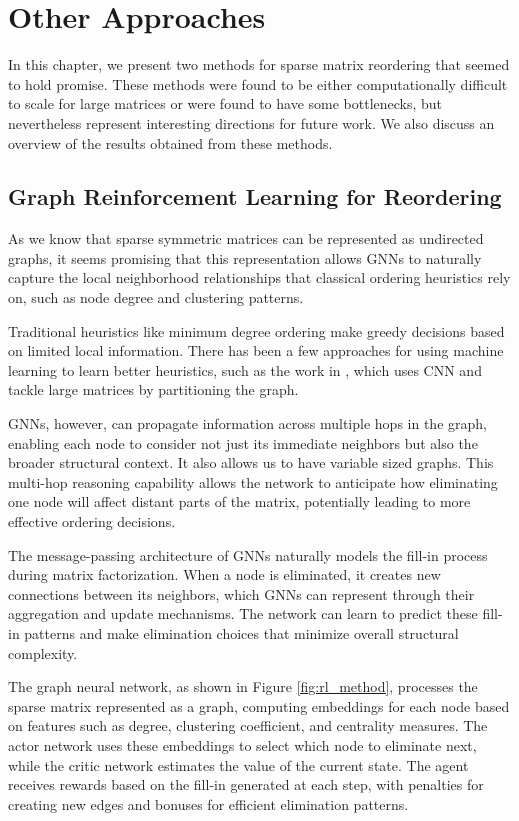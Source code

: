 \chapter{Other Approaches}
\label{ch:other_approaches}

In this chapter, we present two methods for sparse matrix reordering that seemed to hold promise. These methods were found to be either computationally difficult to scale for large matrices or were found to have some bottlenecks, but nevertheless represent interesting directions for future work. We also discuss an overview of the results obtained from these methods.

\section{Graph Reinforcement Learning for Reordering}

As we know that sparse symmetric matrices can be represented as undirected graphs, it seems promising that this representation allows GNNs to naturally capture the local neighborhood relationships that classical ordering heuristics rely on, such as node degree and clustering patterns.

Traditional heuristics like minimum degree ordering make greedy decisions based on limited local information. There has been a few approaches for using machine learning to learn better heuristics, such as the work in \cite{dasgupta_alpha_2023}, which uses CNN and tackle large matrices by partitioning the graph. 

GNNs, however, can propagate information across multiple hops in the graph, enabling each node to consider not just its immediate neighbors but also the broader structural context. It also allows us to have variable sized graphs. This multi-hop reasoning capability allows the network to anticipate how eliminating one node will affect distant parts of the matrix, potentially leading to more effective ordering decisions.

The message-passing architecture of GNNs naturally models the fill-in process during matrix factorization. When a node is eliminated, it creates new connections between its neighbors, which GNNs can represent through their aggregation and update mechanisms. The network can learn to predict these fill-in patterns and make elimination choices that minimize overall structural complexity.

The graph neural network, as shown in Figure \ref{fig:rl_method}, processes the sparse matrix represented as a graph, computing embeddings for each node based on features such as degree, clustering coefficient, and centrality measures. The actor network uses these embeddings to select which node to eliminate next, while the critic network estimates the value of the current state. The agent receives rewards based on the fill-in generated at each step, with penalties for creating new edges and bonuses for efficient elimination patterns.

